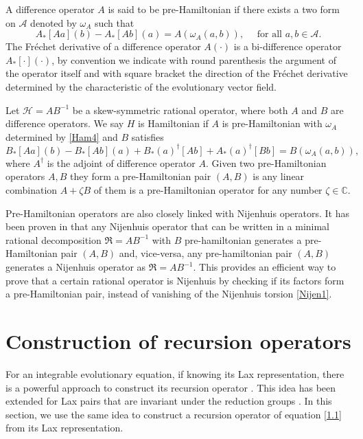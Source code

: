\documentclass{article}
\numberwithin{equation}{section}
\newcommand\cH{{\mathcal H}}
\newcommand\cA{{\mathcal A}}
\begin{document}
	A difference operator $A$ is said to be pre-Hamiltonian if there exists a two form on $\cA$ denoted by $\omega_A$ such that
	\begin{equation}
		A_*[A a](b) - A_*[A b](a) = A (\omega_A (a,b)), \quad \mbox{ for all $a, b \in \cA$.}
		\label{Ham4}
	\end{equation}
The Fr\'echet derivative of a difference operator $A(\cdot)$ is a bi-difference
operator $A_*[\cdot](\cdot)$, by convention we indicate with round parenthesis 
the argument of the operator itself and with square bracket the direction of the Fr\'echet derivative determined by the characteristic of the evolutionary vector field.

Let $\cH=A B^{-1}$ be a skew-symmetric rational operator, where both $A$ and $B$ are difference operators. We say $H$ is Hamiltonian if
$A$ is pre-Hamiltonian with $\omega_A$ determined by \eqref{Ham4} and $B$ satisfies
	\begin{equation}
		B_*[A a](b)-B_*[A b](a)+B_*(a)^\dagger[A b]+A_*(a)^\dagger[B b]
= B (\omega_A(a,b)) ,
		\label{Ham5}
	\end{equation}
where $A^\dagger$ is the adjoint of difference operator $A$.
Given two pre-Hamiltonian operators $A,B$ they form a pre-Hamiltonian pair
$(A,B)$ is any linear combination $A + \zeta B$ of them is a pre-Hamiltonian 
operator for any number $\zeta \in \mathbb{C}$.

Pre-Hamiltonian operators are also closely linked with Nijenhuis
operators.
	It has been proven in \cite{4, 41} that any Nijenhuis operator that can be
written in a minimal rational decomposition $\mathfrak{R} = A B^{-1}$ with $B$
pre-hamiltonian generates a pre-Hamiltonian pair $(A,B)$ and, vice-versa, any 
pre-hamiltonian pair $(A,B)$ generates a Nijenhuis operator as $\mathfrak{R} = A B^{-1}$.
This provides an efficient way to prove that a certain rational operator is
Nijenhuis by checking if its factors form a pre-Hamiltonian pair, instead of vanishing of
the Nijenhuis torsion \eqref{Nijen1}.

\section{Construction of recursion operators}\label{Sec2}
For an integrable evolutionary equation, if knowing its Lax representation, there is a powerful approach to construct its recursion operator \cite{48}.  
This idea has been extended for Lax
pairs that are invariant under the reduction groups \cite{7,1}.
In this section,  we use the same idea to construct a recursion operator 
of equation \eqref{1.1} from its Lax representation.
\end{document}
